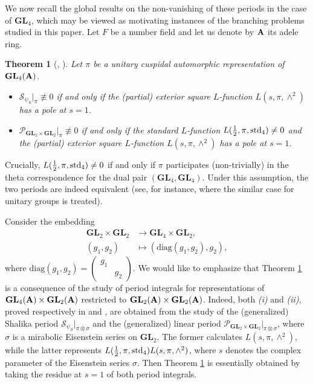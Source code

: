 \documentclass[11pt, reqno]{amsart}
\theoremstyle{plain}
\newtheorem{theorem}{Theorem}[section]
\theoremstyle{definition}
\theoremstyle{remark}
\theoremstyle{plain}
\def\A{{\bf A}}
\def\GL{\mathbf{GL}}
\begin{document}
We now recall the global results on the non-vanishing of these periods in the case of  $\GL_{4}$, which may be viewed as motivating instances of the branching problems studied in this paper. Let $F$ be a number field and let us denote by $\A$ its adele ring. 

\begin{theorem}[{\cite{JacquetShalikaExterior}, \cite{BumpFriedberg}}]\label{JS_BF}
    Let $\pi$ be a unitary cuspidal automorphic representation of $\GL_4(\A)$. \begin{itemize}
        \item[(i)] ${\mathcal{S}_{\psi_S}}{|_\pi} \not \equiv 0$ if and only if the (partial) exterior square $L$-function $L(s,\pi, \wedge^2)$ has a pole at $s=1$. 
    \item[(ii)] $\mathcal{P}_{\GL_2 \times \GL_2}|_{\pi} \not \equiv 0$ if and only if the standard $L$-function $L(\frac{1}{2},\pi, {\rm std}_4) \ne 0$ and the (partial) exterior square $L$-function $L(s,\pi, \wedge^2)$ has a pole at $s=1$.
    \end{itemize}
\end{theorem}

\noindent Crucially, $L(\frac{1}{2},\pi, {\rm std}_4) \ne 0$ if and only if $\pi$ participates (non-trivially) in the theta correspondence for the dual pair $(\GL_4,\GL_4)$. Under this assumption, the two periods are indeed equivalent (see, for instance, \cite[\S 7]{Chen-Gan} where the similar case for unitary groups is treated).

Consider the embedding
\begin{align*}
     \GL_2\times \GL_2&\to \GL_4\times \GL_2 ,\\
    (g_1, g_2) &\mapsto \left( \mathrm{diag}(g_1,g_2),g_2\right),
\end{align*}
where $\mathrm{diag}(g_1,g_2) = \left(\begin{smallmatrix}
        g_1& \\ &g_2\end{smallmatrix}\right)$. We would like to emphasize that Theorem \ref{JS_BF} is a consequence of the study of period integrals for representations of $\GL_4(\A) \times \GL_2(\A)$ restricted to $\GL_2(\A)\times \GL_2(\A)$. Indeed, both \emph{(i)} and \emph{(ii)}, proved respectively in \cite{JacquetShalikaExterior} and \cite{BumpFriedberg}, are obtained from the study of the (generalized) Shalika period ${\mathcal{S}_{\psi_S}}{|_{\pi \otimes \sigma}}$ and the (generalized) linear period $\mathcal{P}_{\GL_2 \times \GL_2}|_{\pi \otimes \sigma}$, where $\sigma$ is a mirabolic Eisenstein series on $\GL_2$. The former calculates $L(s,\pi, \wedge^2)$, while the latter represents $L(\frac{1}{2},\pi, {\rm std}_4)L(s,\pi, \wedge^2)$, where $s$ denotes the complex parameter of the Eisenstein series $\sigma$. Then Theorem \ref{JS_BF} is essentially obtained by taking the residue at $s=1$ of both period integrals.
\\
\end{document}
